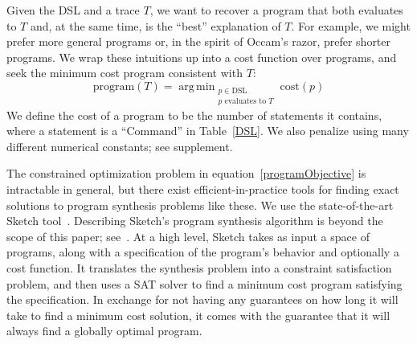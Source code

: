 \documentclass{article}
\DeclareMathOperator*{\argmin}{arg\,min} %
\newcommand{\remark}[1]{\textcolor{red}{[#1]}}
\begin{document}
Given the DSL and a trace $T$, we want to recover a program that both evaluates to $T$
and, at the same time, is the ``best'' explanation of $T$.
For example, we might prefer more general programs or, in the spirit of Occam's razor,
prefer shorter programs.
We wrap these intuitions up into a cost function over programs,
and seek the minimum cost program consistent with $T$:
\begin{equation}
  \text{program}(T) = \argmin_{\substack{p\in \text{DSL}\\p \text{ evaluates to } T}} \text{cost}(p)\label{programObjective}
\end{equation}
We define the
cost of a program to be the number of statements it contains, where a
statement is a ``Command'' in Table~\ref{DSL}.
We also penalize using many different numerical constants; see supplement.

The constrained optimization problem in
equation~\ref{programObjective} is intractable in general, but there
exist efficient-in-practice tools for finding exact solutions to
program synthesis problems like these. We use the state-of-the-art Sketch
tool~\cite{solar2008program}. Describing Sketch's program synthesis
algorithm is beyond the scope of this paper; see~\cite{solar2008program}.  At a
high level, Sketch takes as input a space of programs, along with a
specification of the program's behavior and optionally a cost
function.  It translates the synthesis problem into a constraint
satisfaction problem, and then uses a SAT solver to find a
minimum cost program satisfying the specification.  In exchange for
not having any guarantees on how long it will take to find a minimum
cost solution, it comes with the guarantee that it will always find a
globally optimal program.
\end{document}
